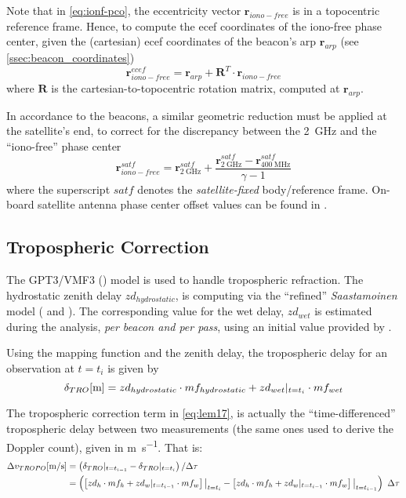 Note that in \autoref{eq:ionf-pco}, the eccentricity vector $\bm{r}_{iono-free}$ 
is in a topocentric reference frame. Hence, to compute the \gls{ecef} coordinates of the 
iono-free phase center, given the (cartesian) \gls{ecef} coordinates of the beacon's 
\gls{arp} $\bm{r}_{arp}$ (see \ref{ssec:beacon_coordinates})
\begin{equation}
  \bm{r}^{ecef}_{iono-free} = \bm{r}_{arp} + \bm{R}^T \cdot \bm{r}_{iono-free}
  \label{eq:arp-to-if-pc}
\end{equation}
where $\bm{R}$ is the cartesian-to-topocentric rotation matrix, computed 
at $\bm{r}_{arp}$.

In accordance to the beacons, a similar geometric reduction must be applied 
at the satellite's end, to correct for the discrepancy between the \SI{2}{\GHz} 
and the ``iono-free'' phase center
\begin{equation}
  \bm{r}^{satf}_{iono-free} = \bm{r}^{satf}_{\SI{2}{\GHz}} + 
    \frac{\bm{r}^{satf}_{\SI{2}{\GHz}} - 
    \bm{r}^{satf}_{\SI{400}{\MHz}}}{\gamma - 1}
\end{equation}
where the superscript $satf$ denotes the \emph{satellite-fixed} body/reference 
frame. On-board satellite antenna phase center offset values can be found in 
\cite{DorisSatModels}.

\subsection{Tropospheric Correction}\label{ssec-tropospheric-correction}
The GPT3/VMF3 (\cite{Landskron2018}) model is used to handle tropospheric refraction. 
The hydrostatic zenith delay $zd_{hydrostatic}$, is computing via the ``refined'' 
\emph{Saastamoinen} model (\cite{Davis1985} and \cite{Saastamoinen1972}). 
The corresponding value for the wet delay, $zd_{wet}$ is estimated during the 
analysis, \emph{per beacon and per pass}, using an initial value provided by 
\cite{Askne1987}.

Using the mapping function and the zenith delay, the tropospheric 
delay for an observation at $t=t_i$ is given by
\begin{equation}\label{eq:tropo-delay}
  \delta _{TRO} [\si{\m}] = zd_{hydrostatic} \cdot mf_{hydrostatic} + zd_{wet}\at{t=t_i} \cdot mf_{wet}
\end{equation}

The tropospheric correction term in \autoref{eq:lem17}, is actually the ``time-differenced'' 
tropospheric delay between two measurements (the same ones used to derive the 
Doppler count), given in \si{\m \per \s}. That is:
\begin{equation}\label{eq:dtrop-diff}
  \begin{aligned}
    \Delta v_{TROPO} [\si{\m \per \s}] 
      &= \left( \delta _{TRO} \at{t=t_{i-1}} - \delta _{TRO} \at{t=t_{i}} \right) / \Delta \tau\\
      &= \left( \left[ zd_{h} \cdot mf_{h} + zd_{w}\at{t=t_{i-1}} \cdot mf_{w} \right]\at[\big]{t=t_i} - 
        \left[ zd_{h} \cdot mf_{h} + zd_{w}\at{t=t_{i-1}} \cdot mf_{w} \right]\at[\big]{t=t_{i-1}} \right) \ \Delta \tau
  \end{aligned}
\end{equation}

